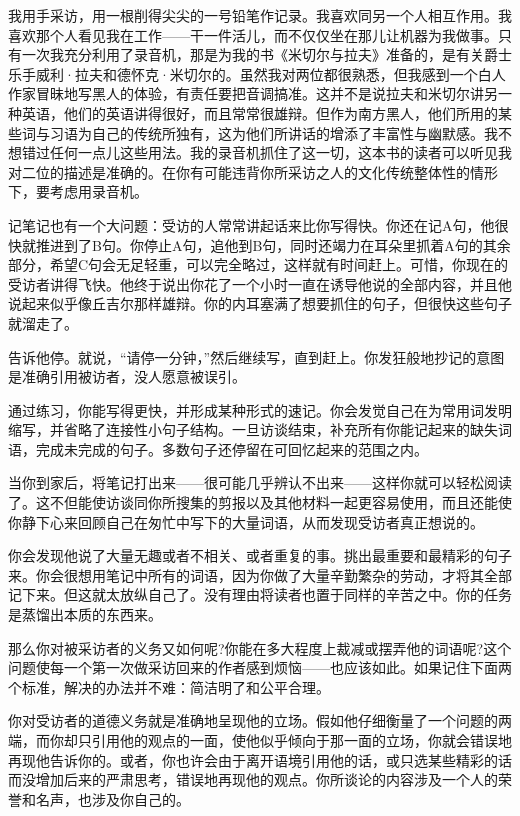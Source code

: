 我用手采访，用一根削得尖尖的一号铅笔作记录。我喜欢同另一个人相互作用。我喜欢那个人看见我在工作——干一件活儿，而不仅仅坐在那儿让机器为我做事。只有一次我充分利用了录音机，那是为我的书《米切尔与拉夫》准备的，是有关爵士乐手威利·拉夫和德怀克·米切尔的。虽然我对两位都很熟悉，但我感到一个白人作家冒昧地写黑人的体验，有责任要把音调搞准。这并不是说拉夫和米切尔讲另一种英语，他们的英语讲得很好，而且常常很雄辩。但作为南方黑人，他们所用的某些词与习语为自己的传统所独有，这为他们所讲话的增添了丰富性与幽默感。我不想错过任何一点儿这些用法。我的录音机抓住了这一切，这本书的读者可以听见我对二位的描述是准确的。在你有可能违背你所采访之人的文化传统整体性的情形下，要考虑用录音机。

记笔记也有一个大问题：受访的人常常讲起话来比你写得快。你还在记A句，他很快就推进到了B句。你停止A句，追他到B句，同时还竭力在耳朵里抓着A句的其余部分，希望C句会无足轻重，可以完全略过，这样就有时间赶上。可惜，你现在的受访者讲得飞快。他终于说出你花了一个小时一直在诱导他说的全部内容，并且他说起来似乎像丘吉尔那样雄辩。你的内耳塞满了想要抓住的句子，但很快这些句子就溜走了。

告诉他停。就说，“请停一分钟，”然后继续写，直到赶上。你发狂般地抄记的意图是准确引用被访者，没人愿意被误引。

通过练习，你能写得更快，并形成某种形式的速记。你会发觉自己在为常用词发明缩写，并省略了连接性小句子结构。一旦访谈结束，补充所有你能记起来的缺失词语，完成未完成的句子。多数句子还停留在可回忆起来的范围之内。

当你到家后，将笔记打出来——很可能几乎辨认不出来——这样你就可以轻松阅读了。这不但能使访谈同你所搜集的剪报以及其他材料一起更容易使用，而且还能使你静下心来回顾自己在匆忙中写下的大量词语，从而发现受访者真正想说的。

你会发现他说了大量无趣或者不相关、或者重复的事。挑出最重要和最精彩的句子来。你会很想用笔记中所有的词语，因为你做了大量辛勤繁杂的劳动，才将其全部记下来。但这就太放纵自己了。没有理由将读者也置于同样的辛苦之中。你的任务是蒸馏出本质的东西来。

那么你对被采访者的义务又如何呢?你能在多大程度上裁减或摆弄他的词语呢?这个问题使每一个第一次做采访回来的作者感到烦恼——也应该如此。如果记住下面两个标准，解决的办法并不难：简洁明了和公平合理。

你对受访者的道德义务就是准确地呈现他的立场。假如他仔细衡量了一个问题的两端，而你却只引用他的观点的一面，使他似乎倾向于那一面的立场，你就会错误地再现他告诉你的。或者，你也许会由于离开语境引用他的话，或只选某些精彩的话而没增加后来的严肃思考，错误地再现他的观点。你所谈论的内容涉及一个人的荣誉和名声，也涉及你自己的。

